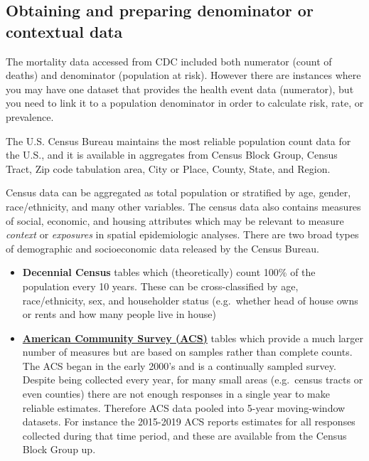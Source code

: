 \documentclass[
]{book}
\providecommand{\tightlist}{%
  \setlength{\itemsep}{0pt}\setlength{\parskip}{0pt}}
\begin{document}
\hypertarget{obtaining-and-preparing-denominator-or-contextual-data}{%
\subsection{Obtaining and preparing denominator or contextual data}\label{obtaining-and-preparing-denominator-or-contextual-data}}

The mortality data accessed from CDC included both numerator (count of deaths) and denominator (population at risk). However there are instances where you may have one dataset that provides the health event data (numerator), but you need to link it to a population denominator in order to calculate risk, rate, or prevalence.

The U.S. Census Bureau maintains the most reliable population count data for the U.S., and it is available in aggregates from Census Block Group, Census Tract, Zip code tabulation area, City or Place, County, State, and Region.

Census data can be aggregated as total population or stratified by age, gender, race/ethnicity, and many other variables. The census data also contains measures of social, economic, and housing attributes which may be relevant to measure \emph{context} or \emph{exposures} in spatial epidemiologic analyses. There are two broad types of demographic and socioeconomic data released by the Census Bureau.

\begin{itemize}
\tightlist
\item
  \textbf{Decennial Census} tables which (theoretically) count 100\% of the population every 10 years. These can be cross-classified by age, race/ethnicity, sex, and householder status (e.g.~whether head of house owns or rents and how many people live in house)
\item
  \textbf{\href{https://www.census.gov/programs-surveys/acs}{American Community Survey (ACS)}} tables which provide a much larger number of measures but are based on samples rather than complete counts. The ACS began in the early 2000's and is a continually sampled survey. Despite being collected every year, for many small areas (e.g.~census tracts or even counties) there are not enough responses in a single year to make reliable estimates. Therefore ACS data pooled into 5-year moving-window datasets. For instance the 2015-2019 ACS reports estimates for all responses collected during that time period, and these are available from the Census Block Group up.
\end{itemize}
\end{document}
